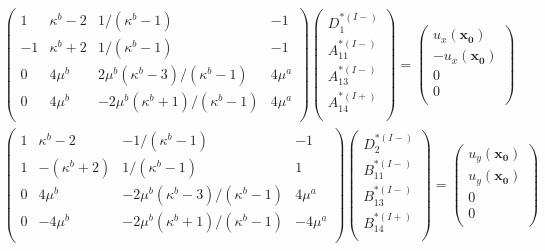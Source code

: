 \begin{align}
	\left(
	\begin{array}{cccc}
		1& \kappa^b-2 & 1/(\kappa^b-1) & -1 \\
		-1 & \kappa^b+2 & 1/(\kappa^b-1) & -1 \\
		0 & 4\mu^{b} & 2\mu^{b}(\kappa^b-3)/(\kappa^b-1) & 4\mu^{a} \\
		0 & 4\mu^{b} & -2\mu^{b}(\kappa^b+1)/(\kappa^b-1) & 4\mu^{a} \\
	\end{array}
	\right)
	\left(
	\begin{array}{c}
		D_{1}^{*(I-)} \\
	 	A_{11}^{*(I-)} \\
		A_{13}^{*(I-)}\\
	 	A_{14}^{*(I+)} \\
	\end{array}
	\right)
	=
	\left(
	\begin{array}{c}
		u_{x}(\bm{x_{0}}) \\
	 	-u_{x}(\bm{x_{0}}) \\
		0 \\
	 	0 \\
	\end{array}
	\right)
\end{align}
\begin{align}
	\left(
	\begin{array}{cccc}
		1& \kappa^b-2 & -1/(\kappa^b-1) & -1 \\
		1 & -(\kappa^b+2) & 1/(\kappa^b-1) & 1 \\
		0 & 4\mu^{b} & -2\mu^{b}(\kappa^b-3)/(\kappa^b-1) & 4\mu^{a} \\
		0 & -4\mu^{b} & -2\mu^{b}(\kappa^b+1)/(\kappa^b-1) & -4\mu^{a} \\
	\end{array}
	\right)
	\left(
	\begin{array}{c}
		D_{2}^{*(I-)} \\
	 	B_{11}^{*(I-)} \\
		B_{13}^{*(I-)}\\
	 	B_{14}^{*(I+)} \\
	\end{array}
	\right)
	=
	\left(
	\begin{array}{c}
		u_{y}(\bm{x_{0}}) \\
	 	u_{y}(\bm{x_{0}}) \\
		0 \\
	 	0 \\
	\end{array}
	\right)
\end{align}
